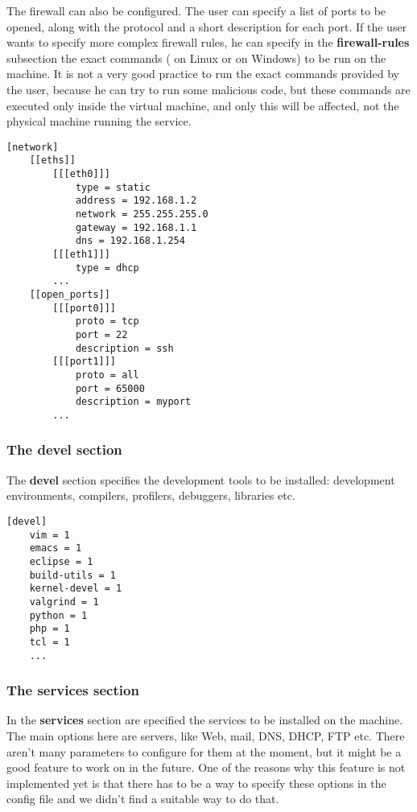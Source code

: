 The firewall can also be configured. The user can specify a list of ports to be
opened, along with the protocol and a short description for each port. If the
user wants to specify more complex firewall rules, he can specify in the
\textbf{firewall-rules} subsection the exact commands ( on
Linux or  on Windows) to be run on the machine. It is
not a very good practice to run the exact commands provided by the user,
because he can try to run some malicious code, but these commands are executed
only inside the virtual machine, and only this will be affected, not the
physical machine running the service.

\lstset{caption=sample network section (Windows guest),label=lst:network-section}
\begin{lstlisting}
[network]
	[[eths]]
		[[[eth0]]]
			type = static
			address = 192.168.1.2
			network = 255.255.255.0
			gateway = 192.168.1.1
			dns = 192.168.1.254
		[[[eth1]]]
			type = dhcp
		...
	[[open_ports]]
		[[[port0]]]
			proto = tcp
			port = 22
			description = ssh
		[[[port1]]]
			proto = all
			port = 65000
			description = myport
		...
\end{lstlisting}

\subsubsection{The devel section}
\label{sub-sub-sec:devel-sec}
The \textbf{devel} section specifies the development tools to be installed:
development environments, compilers, profilers, debuggers, libraries etc.

\lstset{caption=sample devel section (Linux guest),label=lst:devel-section}
\begin{lstlisting}
[devel]
	vim = 1
	emacs = 1
	eclipse = 1
	build-utils = 1
	kernel-devel = 1
	valgrind = 1
	python = 1
	php = 1
	tcl = 1
	...
\end{lstlisting}


\subsubsection{The services section}
\label{sub-sub-sec:services-sec}
In the \textbf{services} section are specified the services to be installed on
the machine. The main options here are servers, like Web, mail, DNS, DHCP, FTP
etc. There aren't many parameters to configure for them at the moment, but it
might be a good feature to work on in the future. One of the reasons why this
feature is not implemented yet is that there has to be a way to specify these
options in the config file and we didn't find a suitable way to do that. 

